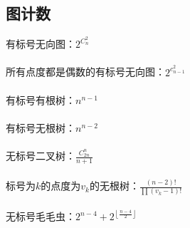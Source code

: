 \subsection{图计数} 
    有标号无向图：$2^{C_{n}^{2}}$\\
    \\
    所有点度都是偶数的有标号无向图：$2^{c_{n-1}^{2}}$\\
    \\
    有标号有根树：$n^{n-1}$\\
    \\
    有标号无根树：$n^{n-2}$\\
    \\
    无标号二叉树：$\frac{C_{2n}^{n}}{n+1}$\\
    \\
    标号为$k$的点度为$v_k$的无根树：$\frac{(n-2)!}{\prod{(v_k-1)!}}$\\
    \\
    无标号毛毛虫：$2^{n-4}+2^{\left \lfloor \frac{n-4}{2} \right \rfloor}$\\